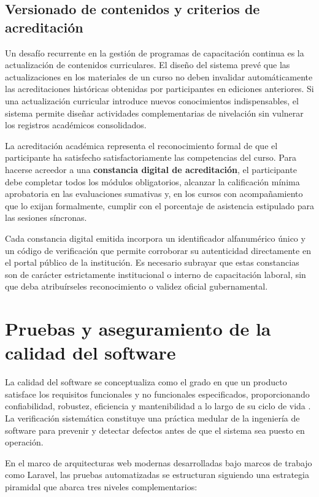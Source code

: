 \subsection{Versionado de contenidos y criterios de acreditación}

Un desafío recurrente en la gestión de programas de capacitación continua es la actualización de contenidos curriculares. El diseño del sistema prevé que las actualizaciones en los materiales de un curso no deben invalidar automáticamente las acreditaciones históricas obtenidas por participantes en ediciones anteriores. Si una actualización curricular introduce nuevos conocimientos indispensables, el sistema permite diseñar actividades complementarias de nivelación sin vulnerar los registros académicos consolidados.

La acreditación académica representa el reconocimiento formal de que el participante ha satisfecho satisfactoriamente las competencias del curso. Para hacerse acreedor a una \textbf{constancia digital de acreditación}, el participante debe completar todos los módulos obligatorios, alcanzar la calificación mínima aprobatoria en las evaluaciones sumativas y, en los cursos con acompañamiento que lo exijan formalmente, cumplir con el porcentaje de asistencia estipulado para las sesiones síncronas.

Cada constancia digital emitida incorpora un identificador alfanumérico único y un código de verificación que permite corroborar su autenticidad directamente en el portal público de la institución. Es necesario subrayar que estas constancias son de carácter estrictamente institucional o interno de capacitación laboral, sin que deba atribuírseles reconocimiento o validez oficial gubernamental.

\section{Pruebas y aseguramiento de la calidad del software}

La calidad del software se conceptualiza como el grado en que un producto satisface los requisitos funcionales y no funcionales especificados, proporcionando confiabilidad, robustez, eficiencia y mantenibilidad a lo largo de su ciclo de vida \cite{pressman2019software}. La verificación sistemática constituye una práctica medular de la ingeniería de software para prevenir y detectar defectos antes de que el sistema sea puesto en operación.

En el marco de arquitecturas web modernas desarrolladas bajo marcos de trabajo como Laravel, las pruebas automatizadas se estructuran siguiendo una estrategia piramidal que abarca tres niveles complementarios:


